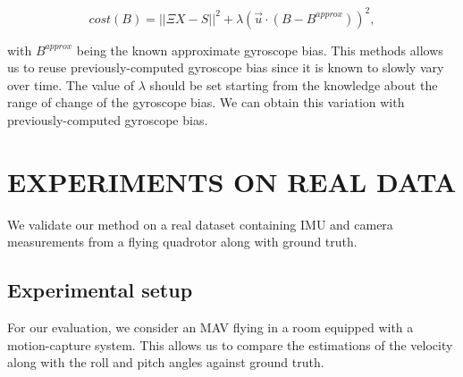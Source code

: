 \documentclass[letterpaper, 10 pt, journal, twoside]{IEEEtran}  %
\begin{document}
\[
cost(B) = ||\Xi X - S||^2 +  \lambda (\vec{u} \cdot (B - B^{approx} ))^2,
\]

\noindent with $B^{approx}$ being the known approximate gyroscope bias.
This methods allows us to reuse previously-computed gyroscope bias since it is known to slowly vary over time.
The value of $\lambda$ should be set starting from the knowledge about the range of change of the gyroscope bias.
We can obtain this variation with previously-computed gyroscope bias.

\section{EXPERIMENTS ON REAL DATA}\label{SectionPerformance}

We validate our method on a real dataset containing IMU and camera measurements from a flying quadrotor along with ground truth.

\subsection{Experimental setup}\label{SubsectionSetup}

For our evaluation, we consider an MAV flying in a room equipped with a motion-capture system.
This allows us to compare the estimations of the velocity along with the roll and pitch angles against ground truth.
\end{document}
